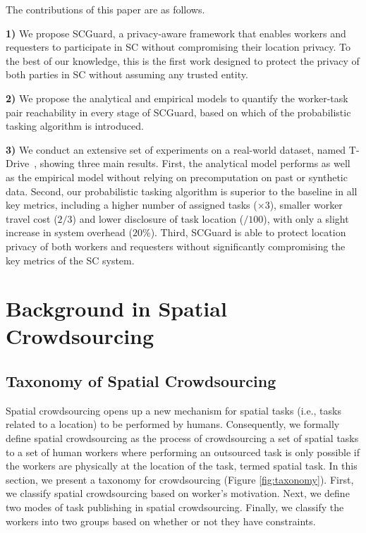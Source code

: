 \documentclass{USC-Thesis}
\numberwithin{equation}{chapter}
\begin{document}
The contributions of this paper are as follows.
\vspace{0.05in}

\noindent \textbf{1)} We propose SCGuard, a privacy-aware framework that enables workers and requesters to participate in SC without compromising their location privacy. To the best of our knowledge, this is the first work designed to protect the privacy of both parties in SC without assuming any trusted entity.

\noindent \textbf{2)} We propose the analytical and empirical models to quantify the worker-task pair reachability in every stage of SCGuard, based on which of the probabilistic tasking algorithm is introduced.

\noindent \textbf{3)} We conduct an extensive set of experiments on a real-world dataset, named T-Drive~\cite{yuan2010t}, showing three main results. First, the analytical model performs as well as the empirical model without relying on precomputation on past or synthetic data. Second, our probabilistic tasking algorithm is superior to the baseline in all key metrics, including a higher number of assigned tasks ($\times 3$), smaller worker travel cost ($2/3$) and lower disclosure of task location ($/100$), with only a slight increase in system overhead ($20\%$). Third, SCGuard is able to protect location privacy of both workers and requesters without significantly compromising the key metrics of the SC system.

\chapter{Background in Spatial Crowdsourcing}
\section{Taxonomy of Spatial Crowdsourcing}
\label{sec:taxonomy}
Spatial crowdsourcing opens up a new mechanism for spatial tasks (i.e., tasks related to a location) to be performed by humans. Consequently, we formally define spatial crowdsourcing as the process of crowdsourcing a set of spatial tasks to a set of human workers where performing an outsourced task is only possible if the workers are physically at the location of the task, termed spatial task. In this section, we present a taxonomy for crowdsourcing (Figure \ref{fig:taxonomy}). First, we classify spatial crowdsourcing based on worker's motivation. Next, we define two modes of task publishing in spatial crowdsourcing. Finally, we classify the workers into two groups based on whether or not they have constraints.
\end{document}
